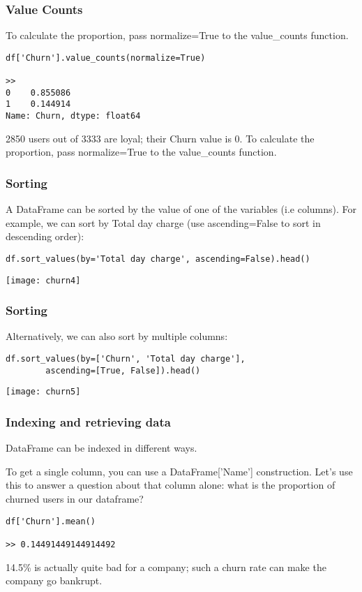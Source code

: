 \begin{frame}[fragile]\frametitle{Value Counts}	
 To calculate the proportion, pass normalize=True to the value\_counts function.
\begin{lstlisting}
df['Churn'].value_counts(normalize=True)

>>
0    0.855086
1    0.144914
Name: Churn, dtype: float64
\end{lstlisting}
2850 users out of 3333 are loyal; their Churn value is 0. To calculate the proportion, pass normalize=True to the value\_counts function.
\end{frame}

\begin{frame}[fragile]\frametitle{Sorting}	
A DataFrame can be sorted by the value of one of the variables (i.e columns). For example, we can sort by Total day charge (use ascending=False to sort in descending order):
\begin{lstlisting}
df.sort_values(by='Total day charge', ascending=False).head()
\end{lstlisting}
\begin{center}
\texttt{[image: churn4]}
\end{center}
\end{frame}

\begin{frame}[fragile]\frametitle{Sorting}	
Alternatively, we can also sort by multiple columns:
\begin{lstlisting}
df.sort_values(by=['Churn', 'Total day charge'],
        ascending=[True, False]).head()
\end{lstlisting}
\begin{center}
\texttt{[image: churn5]}
\end{center}
\end{frame}

\begin{frame}[fragile]\frametitle{Indexing and retrieving data}	
DataFrame can be indexed in different ways.

To get a single column, you can use a DataFrame['Name'] construction. Let's use this to answer a question about that column alone: what is the proportion of churned users in our dataframe?
\begin{lstlisting}
df['Churn'].mean()

>> 0.14491449144914492
\end{lstlisting}

14.5\% is actually quite bad for a company; such a churn rate can make the company go bankrupt.
\end{frame}


